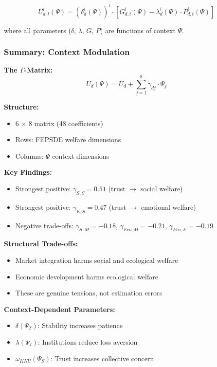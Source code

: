 \begin{equation}
\boxed{
U^i_{d,t}(\Psi) = (\delta^i_d(\Psi))^t \cdot \left[ G^i_{d,t}(\Psi) - \lambda^i_d(\Psi) \cdot P^i_{d,t}(\Psi) \right]
}
\end{equation}

where all parameters ($\delta$, $\lambda$, $G$, $P$) are functions of context $\Psi$.

\subsubsection{Summary: Context Modulation}

\begin{tcolorbox}[colback=gray!5!white, colframe=gray!75!black, title=Section 10.7 Summary]
\textbf{The $\Gamma$-Matrix:}
$$U_d(\Psi) = \bar{U}_d + \sum_{j=1}^{8} \gamma_{dj} \cdot \Psi_j$$

\textbf{Structure:}
\begin{itemize}
\item 6 $\times$ 8 matrix (48 coefficients)
\item Rows: FEPSDE welfare dimensions
\item Columns: $\Psi$ context dimensions
\end{itemize}

\textbf{Key Findings:}
\begin{itemize}
\item Strongest positive: $\gamma_{S,S} = 0.51$ (trust $\rightarrow$ social welfare)
\item Strongest positive: $\gamma_{E,S} = 0.47$ (trust $\rightarrow$ emotional welfare)
\item Negative trade-offs: $\gamma_{S,M} = -0.18$, $\gamma_{Eco,M} = -0.21$, $\gamma_{Eco,E} = -0.19$
\end{itemize}

\textbf{Structural Trade-offs:}
\begin{itemize}
\item Market integration harms social and ecological welfare
\item Economic development harms ecological welfare
\item These are genuine tensions, not estimation errors
\end{itemize}

\textbf{Context-Dependent Parameters:}
\begin{itemize}
\item $\delta(\Psi_T)$: Stability increases patience
\item $\lambda(\Psi_I)$: Institutions reduce loss aversion
\item $\omega_{KNU}(\Psi_S)$: Trust increases collective concern
\end{itemize}


\end{tcolorbox}
